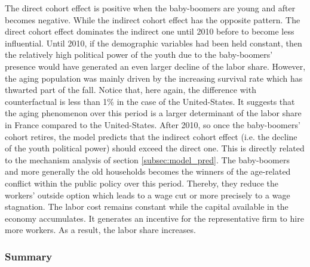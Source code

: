 The direct cohort effect is positive when the baby-boomers are young and after becomes negative. While the indirect cohort effect has the opposite pattern. The direct cohort effect dominates the indirect one until 2010 before to become less influential. Until 2010, if the demographic variables had been held constant, then the relatively high political power of the youth due to the baby-boomers' presence would have generated an even larger decline of the labor share. However, the aging population was mainly driven by the increasing survival rate which has thwarted part of the fall. Notice that, here again, the difference with counterfactual is less than 1\% in the case of the United-States. It suggests that the aging phenomenon over this period is a larger determinant of the labor share in France compared to the United-States.
After 2010, so once the baby-boomers' cohort retires, the model predicts that the indirect cohort effect (i.e. the decline of the youth political power) should exceed the direct one. This is directly related to the mechanism analysis of section \ref{subsec:model_pred}. The baby-boomers and more generally the old households becomes the winners of the age-related conflict within the public policy over this period. Thereby, they reduce the workers' outside option which leads to a wage cut or more precisely to a wage stagnation. The labor cost remains constant while the capital available in the economy accumulates. It generates an incentive for the representative firm to hire more workers. As a result, the labor share increases.

\subsubsection{Summary}

